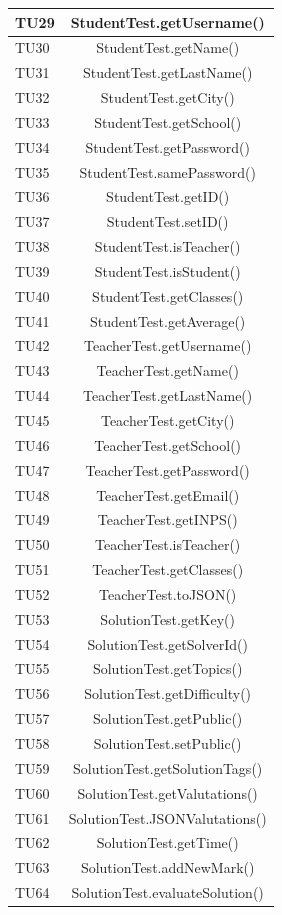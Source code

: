 \begin{longtable}{|>{\centering\arraybackslash}m{1.6cm}|c|}
		TU29 & StudentTest.getUsername() \\ \hline
		TU30 & StudentTest.getName()\\ \hline
		TU31 & StudentTest.getLastName() \\ \hline
		TU32 & StudentTest.getCity() \\ \hline
		TU33 & StudentTest.getSchool() \\ \hline
		TU34 & StudentTest.getPassword() \\ \hline
		TU35 & StudentTest.samePassword()\\ \hline
		TU36 & StudentTest.getID()\\ \hline
		TU37 & StudentTest.setID()\\ \hline
		TU38 & StudentTest.isTeacher() \\ \hline
		TU39 & StudentTest.isStudent() \\ \hline
		TU40 & StudentTest.getClasses() \\ \hline
		TU41 & StudentTest.getAverage()\\ \hline
		
		TU42 & TeacherTest.getUsername()\\ \hline
		TU43 & TeacherTest.getName() \\ \hline
		TU44 & TeacherTest.getLastName() \\ \hline
		TU45 & TeacherTest.getCity() \\ \hline
		TU46 & TeacherTest.getSchool() \\ \hline
		TU47 & TeacherTest.getPassword() \\ \hline
		TU48 & TeacherTest.getEmail() \\ \hline
		TU49 & TeacherTest.getINPS()\\ \hline
		TU50 & TeacherTest.isTeacher() \\ \hline
		TU51 & TeacherTest.getClasses() \\ \hline
		TU52 & TeacherTest.toJSON()\\ \hline
		
		TU53 & SolutionTest.getKey()\\ \hline
		TU54 & SolutionTest.getSolverId()\\ \hline
		TU55 & SolutionTest.getTopics()\\ \hline
		TU56 & SolutionTest.getDifficulty()\\ \hline
		TU57 & SolutionTest.getPublic()\\ \hline
		TU58 & SolutionTest.setPublic()\\ \hline
		TU59 & SolutionTest.getSolutionTags()\\ \hline
		TU60 & SolutionTest.getValutations()\\ \hline
		TU61 & SolutionTest.JSONValutations()\\ \hline
		TU62 & SolutionTest.getTime()\\ \hline
		TU63 & SolutionTest.addNewMark()\\ \hline
		TU64 & SolutionTest.evaluateSolution()\\ \hline
		

\end{longtable}

